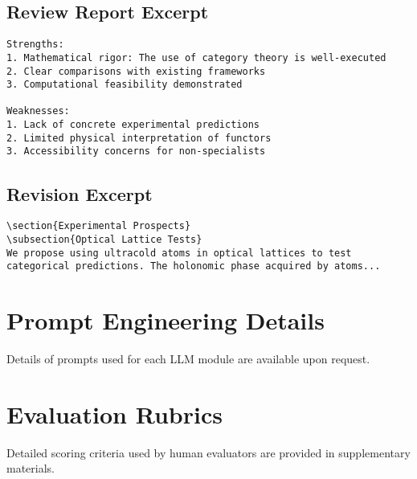 \documentclass[11pt,a4paper]{article}
\begin{document}
\subsection{Review Report Excerpt}

\begin{verbatim}
Strengths:
1. Mathematical rigor: The use of category theory is well-executed
2. Clear comparisons with existing frameworks
3. Computational feasibility demonstrated

Weaknesses:
1. Lack of concrete experimental predictions
2. Limited physical interpretation of functors
3. Accessibility concerns for non-specialists
\end{verbatim}

\subsection{Revision Excerpt}

\begin{verbatim}
\section{Experimental Prospects}
\subsection{Optical Lattice Tests}
We propose using ultracold atoms in optical lattices to test 
categorical predictions. The holonomic phase acquired by atoms...
\end{verbatim}

\section{Prompt Engineering Details}

Details of prompts used for each LLM module are available upon request.

\section{Evaluation Rubrics}

Detailed scoring criteria used by human evaluators are provided in supplementary materials.
\end{document}
